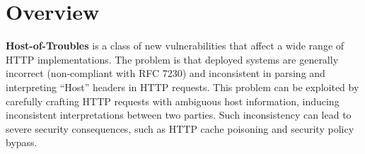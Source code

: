 \section{Overview}
\textbf{Host-of-Troubles} is a class of new vulnerabilities that affect a wide range of HTTP implementations. The problem is that deployed systems are generally incorrect (non-compliant with RFC 7230) and inconsistent in parsing and interpreting “Host” headers in HTTP requests. This problem can be exploited by carefully crafting HTTP requests with ambiguous host information, inducing inconsistent interpretations between two parties. Such inconsistency can lead to severe security consequences, such as HTTP cache poisoning and security policy bypass.